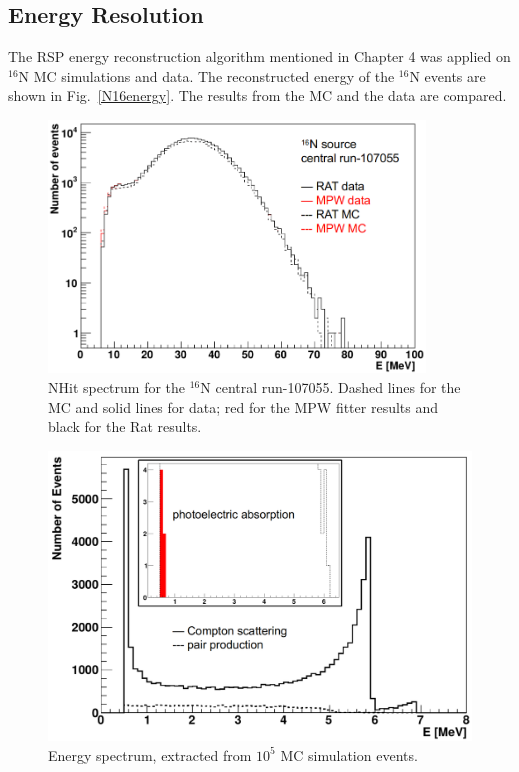 \subsection{Energy Resolution}
The RSP energy reconstruction algorithm mentioned in Chapter 4 was applied on $^{16}$N MC simulations and data.
The reconstructed energy of the $^{16}$N events are shown in Fig.~\ref{N16energy}. The results from the MC and the data are compared.
\begin{figure}[htbp]
	\centering
	\includegraphics[width=10cm]{N16_nhits_107055.png}
	\caption{NHit spectrum for the $^{16}$N central run-107055. Dashed lines for the MC and solid lines for data; red for the MPW fitter results and black for the Rat results.}
	\label{N16nhits}
\end{figure}

\begin{figure}[htbp]
	\centering
	\includegraphics[width=12cm]{N16_MCenergySpectrum.png}
	\caption{Energy spectrum, extracted from $10^5$ MC simulation events.}
	\label{N16nhitsSimu}
\end{figure}


